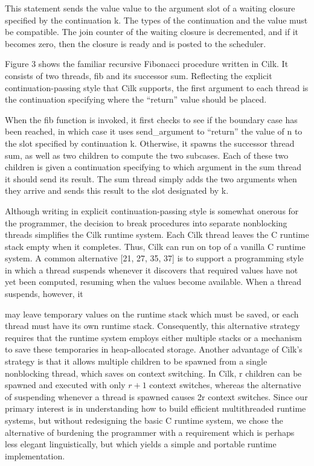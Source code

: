 \documentclass[
]{article}
\begin{document}
This statement sends the value value to the argument slot of a waiting
closure specified by the continuation k. The types of the continuation
and the value must be compatible. The join counter of the waiting
closure is decremented, and if it becomes zero, then the closure is
ready and is posted to the scheduler.

Figure 3 shows the familiar recursive Fibonacci procedure written in
Cilk. It consists of two threads, fib and its successor sum. Reflecting
the explicit continuation-passing style that Cilk supports, the first
argument to each thread is the continuation specifying where the
``return'' value should be placed.

When the fib function is invoked, it first checks to see if the boundary
case has been reached, in which case it uses send\_argument to
``return'' the value of n to the slot specified by continuation k.
Otherwise, it spawns the successor thread sum, as well as two children
to compute the two subcases. Each of these two children is given a
continuation specifying to which argument in the sum thread it should
send its result. The sum thread simply adds the two arguments when they
arrive and sends this result to the slot designated by k.

Although writing in explicit continuation-passing style is somewhat
onerous for the programmer, the decision to break procedures into
separate nonblocking threads simplifies the Cilk runtime system. Each
Cilk thread leaves the C runtime stack empty when it completes. Thus,
Cilk can run on top of a vanilla C runtime system. A common alternative
{[}21, 27, 35, 37{]} is to support a programming style in which a thread
suspends whenever it discovers that required values have not yet been
computed, resuming when the values become available. When a thread
suspends, however, it

may leave temporary values on the runtime stack which must be saved, or
each thread must have its own runtime stack. Consequently, this
alternative strategy requires that the runtime system employs either
multiple stacks or a mechanism to save these temporaries in
heap-allocated storage. Another advantage of Cilk's strategy is that it
allows multiple children to be spawned from a single nonblocking thread,
which saves on context switching. In Cilk, r children can be spawned and
executed with only \(r + 1\) context switches, whereas the alternative
of suspending whenever a thread is spawned causes 2r context switches.
Since our primary interest is in understanding how to build efficient
multithreaded runtime systems, but without redesigning the basic C
runtime system, we chose the alternative of burdening the programmer
with a requirement which is perhaps less elegant linguistically, but
which yields a simple and portable runtime implementation.
\end{document}
